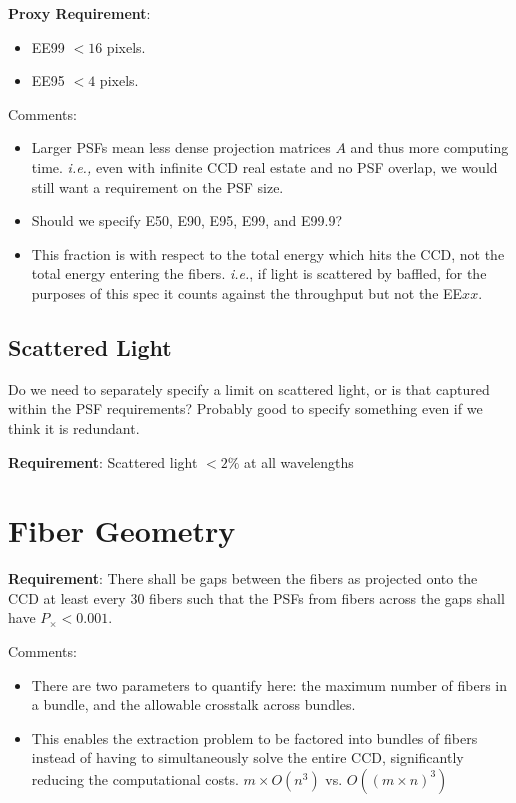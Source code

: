 \documentclass[12pt]{article}
\begin{document}
{\bf Proxy Requirement}:
\begin{itemize}
    \item EE99 $< 16$ pixels.
    \item EE95 $< 4$ pixels.    
\end{itemize}
Comments:
\begin{itemize}
    \item Larger PSFs mean less dense projection matrices $A$ and thus
        more computing time.  {\it i.e.,} even with infinite CCD real estate and no
        PSF overlap, we would still want a requirement on the PSF size.
    \item Should we specify E50, E90, E95, E99, and E99.9?
    \item This fraction is with respect to the total energy
        which hits the CCD, not the total energy entering the fibers.  {\it i.e.},
        if light is scattered by baffled, for the purposes of this spec it counts
        against the throughput but not the EE$xx$.
\end{itemize}

\subsection{Scattered Light}

Do we need to separately specify a limit on scattered light, or is that
captured within the PSF requirements?  Probably good to specify something
even if we think it is redundant.

{\bf Requirement}: Scattered light $< 2\%$ at all wavelengths

\section{Fiber Geometry}

{\bf Requirement}: There shall be gaps between the fibers as projected
onto the CCD at least every 30 fibers such that the PSFs from fibers
across the gaps shall have $P_\times < 0.001$.

Comments:
\begin{itemize}
    \item There are two parameters to quantify here: the maximum number
        of fibers in a bundle, and the allowable crosstalk across bundles.
    \item This enables the extraction problem to be factored into bundles
        of fibers instead of having to simultaneously solve the entire CCD,
        significantly reducing the computational costs.
        $m \times O(n^3)$ vs. $O((m \times n)^3)$
\end{itemize}
\end{document}
